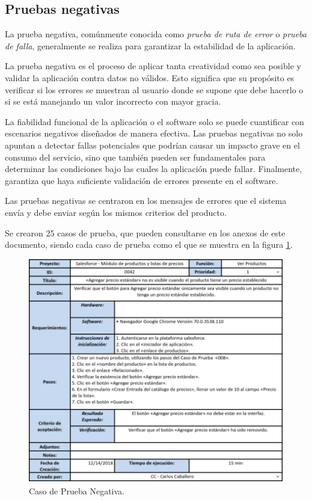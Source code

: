 \subsection{Pruebas negativas}
La prueba negativa, comúnmente conocida como \emph{prueba de ruta de error} o
\emph{prueba de falla}, generalmente se realiza para garantizar la estabilidad
de la aplicación.

La prueba negativa es el proceso de aplicar tanta creatividad como sea posible y
validar la aplicación contra datos no válidos. Esto significa que su propósito
es verificar si los errores se muestran al usuario donde se supone que debe
hacerlo o si se está manejando un valor incorrecto con mayor gracia.

La fiabilidad funcional de la aplicación o el software solo se puede cuantificar
con escenarios negativos diseñados de manera efectiva. Las pruebas negativas no
solo apuntan a detectar fallas potenciales que podrían causar un impacto grave
en el consumo del servicio, sino que también pueden ser fundamentales para
determinar las condiciones bajo las cuales la aplicación puede fallar.
Finalmente, garantiza que haya suficiente validación de errores presente en el
software\cite{Nadig}.

Las pruebas negativas se centraron en los mensajes de errores que el sistema
envía y debe enviar según los mismos criterios del producto.

Se crearon 25 casos de prueba, que pueden consultarse en los anexos de este
documento, siendo cada caso de prueba como el que se muestra en la figura
\ref{tc_negative}.

\begin{figure}
\centering
\includegraphics[width=1.0\textwidth]{graphics/tc3-negative.eps}
\caption{Caso de Prueba Negativa.}
\label{tc_negative}
\end{figure}

